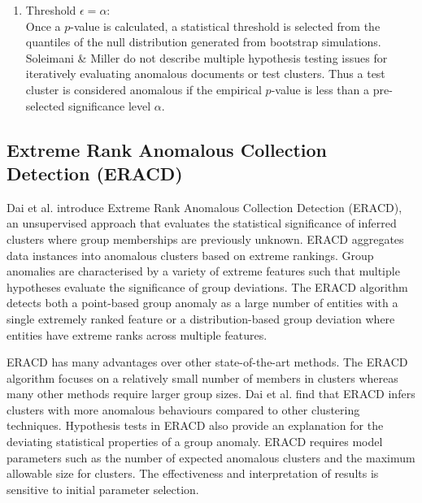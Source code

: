 \begin{enumerate}[4.]
\item Threshold $\epsilon=\alpha$: \\ 
Once a $p$-value is calculated, a statistical threshold is selected from the quantiles of the null distribution generated from bootstrap simulations. 
Soleimani \& Miller \cite{ATD} do not describe multiple hypothesis testing issues for iteratively evaluating   anomalous documents or test clusters. Thus a  test cluster is considered anomalous if the empirical $p$-value is less than a pre-selected  significance level $\alpha$. 
\end{enumerate}
 
 
\subsection{Extreme Rank Anomalous Collection Detection (ERACD)}
Dai et al. \cite{ERACD} introduce Extreme Rank Anomalous Collection Detection (ERACD), an unsupervised approach that evaluates the statistical significance of  inferred clusters %
 where group memberships are previously unknown. ERACD aggregates data instances into anomalous clusters based on extreme rankings. Group anomalies are characterised by a variety of extreme features such that multiple hypotheses evaluate the significance of group deviations. %
The ERACD  algorithm detects both a point-based group anomaly as a large number of entities with a single extremely ranked feature or a distribution-based group deviation where entities have extreme ranks across multiple features.

ERACD has many advantages over other state-of-the-art methods. 
The ERACD  algorithm focuses on a relatively small number of members in clusters whereas many other methods require larger group sizes. Dai et al. \cite{ERACD} find that ERACD infers clusters with more anomalous behaviours compared to other clustering techniques.  Hypothesis tests in ERACD also provide an explanation for the deviating statistical properties of a group anomaly. %
ERACD requires model parameters such as the number of expected anomalous clusters and the maximum allowable size for clusters.  %
  The effectiveness and interpretation of results is sensitive to initial parameter selection.   

